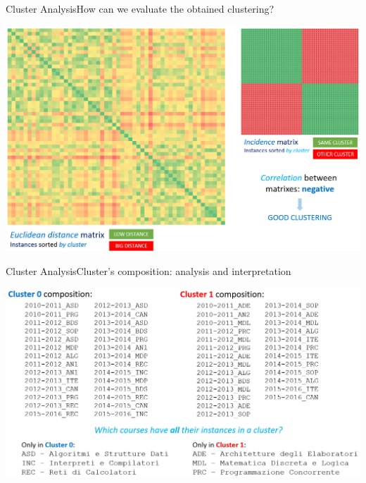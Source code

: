 \begin{frame}{Cluster Analysis}{How can we evaluate the obtained clustering?}

\vspace{0.3cm}
\begin{centering}
    \includegraphics[scale=0.25]{cluster5_nocorr.png}
\end{centering}

\end{frame}

\begin{frame}{Cluster Analysis}{Cluster's composition: analysis and interpretation}

\includegraphics[scale=0.22, trim=2.2cm 0 0 0]{cluster6.png}

\end{frame}
